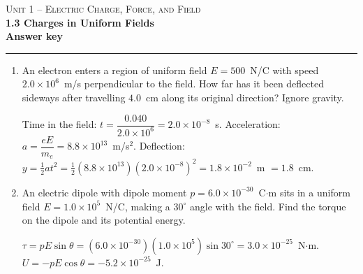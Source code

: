 \documentclass[11pt,letterpaper]{article}
\begin{document}
{\small\textsc{Unit 1 -- Electric Charge, Force, and Field}}\\[2pt]{\Large\bfseries 1.3 Charges in Uniform Fields}\\[8pt]\textbf{Answer key}\\[4pt]\hrule\vspace{10pt}{\small\itshape Placeholder worksheet for the site prototype. Free for classroom use.}\vspace{6pt}
\begin{enumerate}[leftmargin=*,itemsep=10pt]
\item An electron enters a region of uniform field $E = 500$~N/C with speed $2.0\times10^{6}$~m/s perpendicular to the field. How far has it been deflected sideways after travelling $4.0$~cm along its original direction? Ignore gravity.
\begin{answer}Time in the field: $t = \dfrac{0.040}{2.0\times10^{6}} = 2.0\times10^{-8}$~s. Acceleration: $a = \dfrac{eE}{m_e} = 8.8\times10^{13}$~m/s$^2$. Deflection: $y = \tfrac12 a t^2 = \tfrac12(8.8\times10^{13})(2.0\times10^{-8})^2 = 1.8\times10^{-2}$~m $= 1.8$~cm.\end{answer}
\item An electric dipole with dipole moment $p = 6.0\times10^{-30}$~C$\cdot$m sits in a uniform field $E = 1.0\times10^{5}$~N/C, making a $30^\circ$ angle with the field. Find the torque on the dipole and its potential energy.
\begin{answer}$\tau = pE\sin\theta = (6.0\times10^{-30})(1.0\times10^{5})\sin 30^\circ = 3.0\times10^{-25}$~N$\cdot$m. $U = -pE\cos\theta = -5.2\times10^{-25}$~J.\end{answer}
\end{enumerate}
\end{document}
